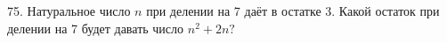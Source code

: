 75. Натуральное число $n$ при делении на 7 даёт в остатке 3. Какой остаток при делении на 7 будет давать число $n^2+2n?$\\
